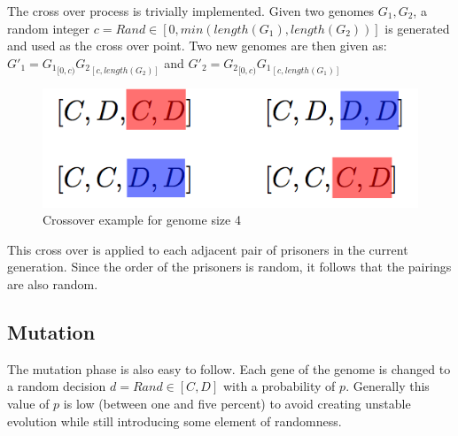 \documentclass[12pt]{article}
\begin{document}
The cross over process is trivially implemented.  Given two genomes $G_1, G_2$,
a random integer $c = Rand \in [0, min(length(G_1), length(G_2))]$ is generated
and used as the cross over point.  Two new genomes are then given as:\\

$G'_1 = {G_1}_{[0,c)}{G_2}_{[c, length(G_2)]}$ and
$G'_2 = {G_2}_{[0, c)}{G_1}_{[c, length(G_1)]}$ \\

\begin{figure}[h]
    \centering
    \includegraphics[scale=0.5]{figures/crossover-example.png}
    \caption{Crossover example for genome size 4}
\end{figure}

This cross over is applied to each adjacent pair of prisoners in the current
generation.  Since the order of the prisoners is random, it follows that the pairings
are also random.

\subsection{Mutation}
\label{mutation}

The mutation phase is also easy to follow.  Each gene of the genome is changed
to a random decision $d = Rand \in [C, D]$ with a probability of $p$.  Generally
this value of $p$ is low (between one and five percent) to avoid creating unstable
evolution while still introducing some element of randomness.

\pagebreak
\end{document}
